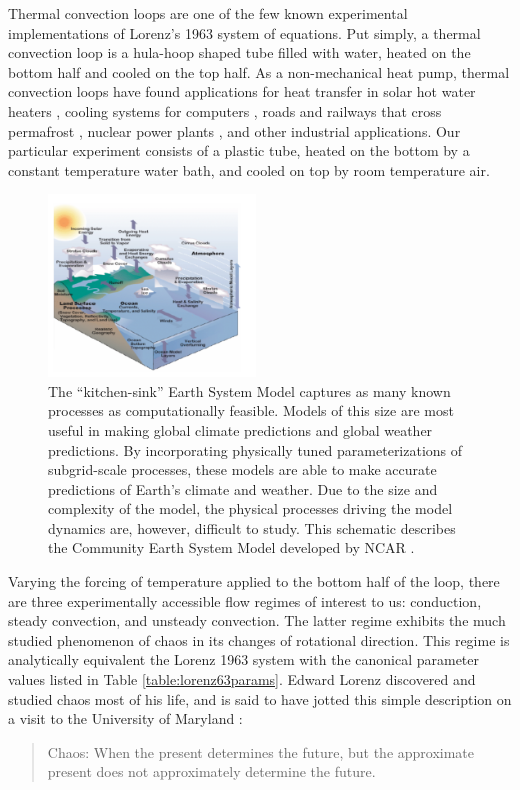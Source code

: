 \documentclass[12pt]{report}
\begin{document}
Thermal convection loops are one of the few known experimental implementations of Lorenz's 1963 system of equations.
Put simply, a thermal convection loop is a hula-hoop shaped tube filled with water, heated on the bottom half and cooled on the top half.
As a non-mechanical heat pump, thermal convection loops have found applications for heat transfer in solar hot water heaters , cooling systems for computers , roads and railways that cross permafrost , nuclear power plants , and other industrial applications.
Our particular experiment consists of a plastic tube, heated on the bottom by a constant temperature water bath, and cooled on top by room temperature air.

\begin{figure}[t!]
  \centering
  \includegraphics[width=0.49\textwidth]{figures/Earth-System-Model-Schematic.png}
  \caption[The ``kitchen-sink'' Earth System Model captures as many known processes as computationally feasible]{
    The ``kitchen-sink'' Earth System Model captures as many known processes as computationally feasible.
    Models of this size are most useful in making global climate predictions and global weather predictions.
    By incorporating physically tuned parameterizations of subgrid-scale processes, these models are able to make accurate predictions of Earth's climate and weather.
    Due to the size and complexity of the model, the physical processes driving the model dynamics are, however, difficult to study.
    This schematic describes the Community Earth System Model developed by NCAR {\protect {}}.
  }
  \label{fig:ESM}
\end{figure}

Varying the forcing of temperature applied to the bottom half of the loop, there are three experimentally accessible flow regimes of interest to us: conduction, steady convection, and unsteady convection.
The latter regime exhibits the much studied phenomenon of chaos in its changes of rotational direction.
This regime is analytically equivalent the Lorenz 1963 system with the canonical parameter values listed in Table \ref{table:lorenz63params}.
Edward Lorenz discovered and studied chaos most of his life, and is said to have jotted this simple description on a visit to the University of Maryland \cite{danforth2013blog}:
\begin{quote}
Chaos: When the present determines the future, but the approximate present does not approximately determine the future.
\end{quote}
\end{document}
